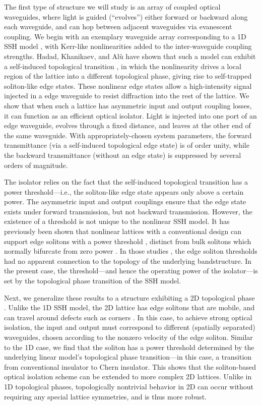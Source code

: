 \documentclass[aps,prx,twocolumn,superscriptaddress]{revtex4-1}
\begin{document}
The first type of structure we will study is an array of coupled optical waveguides, where light is guided (``evolves'') either forward or backward along each waveguide, and can hop between adjacent waveguides via evanescent coupling.  We begin with an exemplary waveguide array corresponding to a 1D SSH model \cite{bernevigbook}, with Kerr-like nonlinearities added to the inter-waveguide coupling strengths.  Hadad, Khanikaev, and Al\`u have shown that such a model can exhibit a self-induced topological transition \cite{alu2016}, in which the nonlinearity drives a local region of the lattice into a different topological phase, giving rise to self-trapped soliton-like edge states.  These nonlinear edge states allow a high-intensity signal injected in a edge waveguide to resist diffraction into the rest of the lattice.  We show that when such a lattice has asymmetric input and output coupling losses, it can function as an efficient optical isolator.  Light is injected into one port of an edge waveguide, evolves through a fixed distance, and leaves at the other end of the same waveguide.  With appropriately-chosen system parameters, the forward transmittance (via a self-induced topological edge state) is of order unity, while the backward transmittance (without an edge state) is suppressed by several orders of magnitude.

The isolator relies on the fact that the self-induced topological transition has a power threshold---i.e., the soliton-like edge state appears only above a certain power.  The asymmetric input and output couplings ensure that the edge state exists under forward transmission, but not backward transmission.  However, the existence of a threshold is not unique to the nonlinear SSH model.  It has previously been shown that nonlinear lattices with a conventional design can support edge solitons with a power threshold \cite{Makris2005,Suntsov2006,Suntsov2007}, distinct from bulk solitons which normally bifurcate from zero power \cite{christodoulides1988}.  In those studies \cite{Makris2005,Suntsov2006,Suntsov2007}, the edge soliton thresholds had no apparent connection to the topology of the underlying bandstructure.  In the present case, the threshold---and hence the operating power of the isolator---is set by the topological phase transition of the SSH model.

Next, we generalize these results to a structure exhibiting a 2D topological phase \cite{rechtsman2013nature}.  Unlike the 1D SSH model, the 2D lattice has edge solitons that are mobile, and can travel around defects such as corners \cite{daniel2016soliton}. In this case, to achieve strong optical isolation, the input and output must correspond to different (spatially separated) waveguides, chosen according to the nonzero velocity of the edge soliton.  Similar to the 1D case, we find that the soliton has a power threshold determined by the underlying linear model's topological phase transition---in this case, a transition from conventional insulator to Chern insulator.  This shows that the soliton-based optical isolation scheme can be extended to more complex 2D lattices.  Unlike in 1D topological phases, topologically nontrivial behavior in 2D can occur without requiring any special lattice symmetries, and is thus more robust.
\end{document}

